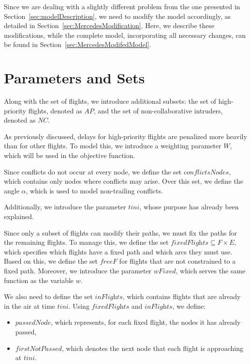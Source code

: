 \documentclass[../thesis.tex]{subfiles}
\begin{document}
Since we are dealing with a slightly different problem from the one presented in Section~\ref{sec:modelDescription}, we need to modify the model accordingly, as detailed in Section~\ref{sec:MercedesModification}.  
Here, we describe these modifications, while the complete model, incorporating all necessary changes, can be found in Section~\ref{sec:MercedesModifedModel}.

\section{Parameters and Sets}

Along with the set of flights, we introduce additional subsets: the set of high-priority flights, denoted as \( AP \), and the set of non-collaborative intruders, denoted as \( NC \).  

As previously discussed, delays for high-priority flights are penalized more heavily than for other flights. To model this, we introduce a weighting parameter \( W \), which will be used in the objective function.  

Since conflicts do not occur at every node, we define the set \( \textit{conflictsNodes} \), which contains only nodes where conflicts may arise. Over this set, we define the angle \( \alpha \), which is used to model non-trailing conflicts.  

Additionally, we introduce the parameter \( tini \), whose purpose has already been explained.  

Since only a subset of flights can modify their paths, we must fix the paths for the remaining flights. To manage this, we define the set \( \textit{fixedFlights} \subseteq F \times E \), which specifies which flights have a fixed path and which arcs they must use. Based on this, we define the set \( \textit{freeF} \) for flights that are not constrained to a fixed path. 
Moreover, we introduce the parameter \( wFixed \), which serves the same function as the variable \( w \).  

We also need to define the set \( \textit{inFlights} \), which contains flights that are already in the air at time \( tini \). Using \( \textit{fixedFlights} \) and \( \textit{inFlights} \), we define:  
\begin{itemize}
    \item \( \textit{passedNode} \), which represents, for each fixed flight, the nodes it has already passed,  
    \item  \( \textit{firstNotPassed} \), which denotes the next node that each flight is approaching at \( tini \).  
\end{itemize}
\end{document}
